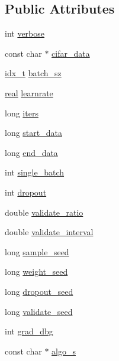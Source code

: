 \subsection*{Public Attributes}
\begin{DoxyCompactItemize}
\item 
int \hyperlink{structcmdline__opt_a2212d80547e3ae3504942006440f7285}{verbose}
\item 
const char $\ast$ \hyperlink{structcmdline__opt_aeaf0e85613dea855a29a691b5915e81a}{cifar\+\_\+data}
\item 
\hyperlink{vgg__util_8h_a8e93478a00e685bea5e6a3f617bf03a3}{idx\+\_\+t} \hyperlink{structcmdline__opt_a417b11f5b6a5213e293ce930a471a786}{batch\+\_\+sz}
\item 
\hyperlink{vgg__util_8h_a1082d08aaa761215ec83e7149f27ad16}{real} \hyperlink{structcmdline__opt_a69793f204ee2703085e3153062f0a3fd}{learnrate}
\item 
long \hyperlink{structcmdline__opt_a430664c4a225528c56f959765371755d}{iters}
\item 
long \hyperlink{structcmdline__opt_adaf2f999b02427309fbdc1f95b614260}{start\+\_\+data}
\item 
long \hyperlink{structcmdline__opt_a7df98cb768e9ee4bb0db68c28b0e8a21}{end\+\_\+data}
\item 
int \hyperlink{structcmdline__opt_a2e2f53ec465901071633192bfdec032a}{single\+\_\+batch}
\item 
int \hyperlink{structcmdline__opt_a0db00c69f0bfa206b17748c0b9ca1d0b}{dropout}
\item 
double \hyperlink{structcmdline__opt_a559a5437432ab522d6f2749876147029}{validate\+\_\+ratio}
\item 
double \hyperlink{structcmdline__opt_a93fd0f470a52208842dd7257b83df50b}{validate\+\_\+interval}
\item 
long \hyperlink{structcmdline__opt_aa92b1cc0e53246cc03bbab7fbc84b5ae}{sample\+\_\+seed}
\item 
long \hyperlink{structcmdline__opt_a70133aad1b243d44e1be18be81633939}{weight\+\_\+seed}
\item 
long \hyperlink{structcmdline__opt_a8618cfd6b437743f58258b580d59b466}{dropout\+\_\+seed}
\item 
long \hyperlink{structcmdline__opt_aab2c1bdc4c5558d0cb084d9dd11f9cec}{validate\+\_\+seed}
\item 
int \hyperlink{structcmdline__opt_a5e70c87e86e82f9d42f6eb341f0902e3}{grad\+\_\+dbg}
\item 
const char $\ast$ \hyperlink{structcmdline__opt_aa5b05fde2a12fcab6f9ce0baf3e29d29}{algo\+\_\+s}

\end{DoxyCompactItemize}
